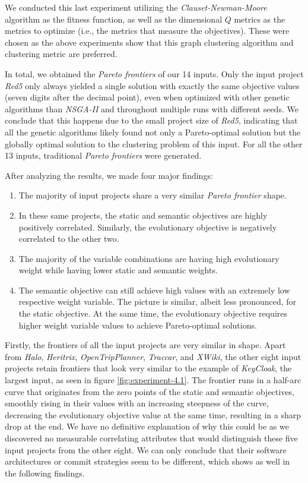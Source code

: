 \documentclass[12pt,a4paper]{report}
\begin{document}
We conducted this last experiment utilizing the \textit{Clauset-Newman-Moore}
algorithm as the fitness function, as well as the dimensional $Q$ metrics
as the metrics to optimize (i.e., the metrics that measure the objectives).
These were chosen as the above experiments show that this graph clustering
algorithm and clustering metric are preferred.

In total, we obtained the \textit{Pareto frontiers} of our 14 inputs.
Only the input project \textit{Red5} only always yielded a single solution
with exactly the same objective values (seven digits after the decimal point),
even when optimized with other genetic algorithms than \textit{NSGA-II} and
throughout multiple runs with different seeds.
We conclude that this happens due to the small project
size of \textit{Red5}, indicating that all the genetic algorithms
likely found not only a Pareto\hyp optimal solution but the globally optimal
solution to the clustering problem of this input.
For all the other 13 inputs, traditional \textit{Pareto frontiers} were
generated.

After analyzing the results, we made four major findings:
\begin{enumerate}
  \item The majority of input projects share a very similar \textit{Pareto frontier} shape.
  \item In these same projects, the static and semantic objectives are highly positively correlated.
        Similarly, the evolutionary objective is negatively correlated to the other two.
  \item The majority of the variable combinations are having high evolutionary weight while having lower static and semantic weights.
  \item The semantic objective can still achieve high values with an extremely low respective weight variable.
        The picture is similar, albeit less pronounced, for the static objective.
        At the same time, the evolutionary objective requires higher weight variable values to achieve Pareto\hyp optimal solutions.
\end{enumerate}

Firstly, the frontiers of all the input projects are very similar in shape.
Apart from \textit{Halo}, \textit{Heritrix}, \textit{OpenTripPlanner},
\textit{Traccar}, and \textit{XWiki}, the other eight input projects retain
frontiers that look very similar to the example of \textit{KeyCloak},
the largest input, as seen in figure \ref{fig:experiment-4.1}.
The frontier runs in a half\hyp arc curve that originates from the zero points
of the static and semantic objectives, smoothly rising in their values with
an increasing steepness of the curve, decreasing the evolutionary objective
value at the same time, resulting in a sharp drop at the end.
We have no definitive explanation of why this could be as we discovered no
measurable correlating attributes that would distinguish these five
input projects from the other eight. We can only conclude that their
software architectures or commit strategies seem to be different,
which shows as well in the following findings.
\end{document}

